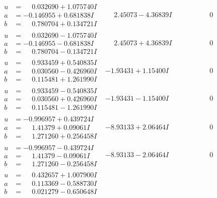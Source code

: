 \documentclass[1p]{elsarticle_modified}
\theoremstyle{definition}
\begin{document}
$$\begin{array}{c|c|c}
\begin{aligned}
u &= \phantom{-}0.032690 + 1.075740 I \\
a &= -0.146955 + 0.681838 I \\
b &= \phantom{-}0.780704 + 0.134721 I\end{aligned}
 & \phantom{-}2.45073 - 4.36839 I & \phantom{-0.000000 } 0 \\ \hline\begin{aligned}
u &= \phantom{-}0.032690 - 1.075740 I \\
a &= -0.146955 - 0.681838 I \\
b &= \phantom{-}0.780704 - 0.134721 I\end{aligned}
 & \phantom{-}2.45073 + 4.36839 I & \phantom{-0.000000 } 0 \\ \hline\begin{aligned}
u &= \phantom{-}0.933459 + 0.540835 I \\
a &= \phantom{-}0.030560 - 0.426960 I \\
b &= \phantom{-}0.115481 + 1.261990 I\end{aligned}
 & -1.93431 + 1.15400 I & \phantom{-0.000000 } 0 \\ \hline\begin{aligned}
u &= \phantom{-}0.933459 - 0.540835 I \\
a &= \phantom{-}0.030560 + 0.426960 I \\
b &= \phantom{-}0.115481 - 1.261990 I\end{aligned}
 & -1.93431 - 1.15400 I & \phantom{-0.000000 } 0 \\ \hline\begin{aligned}
u &= -0.996957 + 0.439724 I \\
a &= \phantom{-}1.41379 + 0.09061 I \\
b &= \phantom{-}1.271260 + 0.256458 I\end{aligned}
 & -8.93133 + 2.06464 I & \phantom{-0.000000 } 0 \\ \hline\begin{aligned}
u &= -0.996957 - 0.439724 I \\
a &= \phantom{-}1.41379 - 0.09061 I \\
b &= \phantom{-}1.271260 - 0.256458 I\end{aligned}
 & -8.93133 - 2.06464 I & \phantom{-0.000000 } 0 \\ \hline\begin{aligned}
u &= \phantom{-}0.432657 + 1.007900 I \\
a &= \phantom{-}0.113369 - 0.588730 I \\
b &= \phantom{-}0.021279 - 0.650648 I\end{aligned}

\end{array}$$
\end{document}

